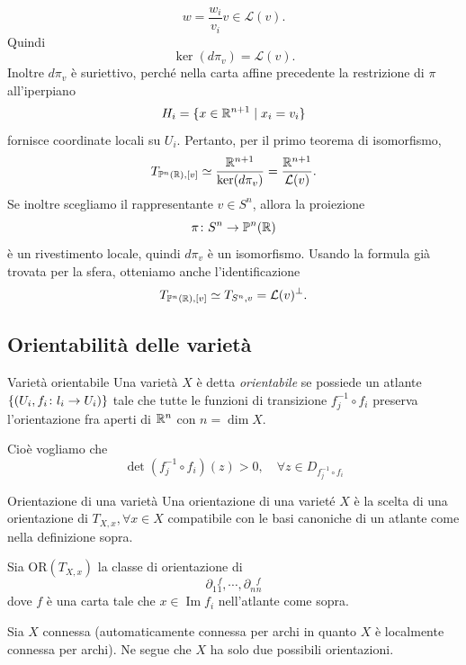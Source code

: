 \documentclass[a4paper]{article}
\begin{document}
\begin{snippetproof}{}
    \[
        w=\frac{w_i}{v_i}v\in\mathcal{L}(v).
    \]
    Quindi
    \[
        \ker(d\pi_v)=\mathcal{L}(v).
    \]
    Inoltre \(d\pi_v\) è suriettivo, perché nella carta affine precedente la restrizione di \(\pi\) all'iperpiano
    \[
        H_i=\{x\in\mathbb{R}^{n+1}\mid x_i=v_i\}
    \]
    fornisce coordinate locali su \(U_i\). Pertanto, per il primo teorema di isomorfismo,
    \[
        T_{\mathbb{P}^n(\mathbb{R}),[v]}
        \simeq
        \frac{\mathbb{R}^{n+1}}{\ker(d\pi_v)}
        =
        \frac{\mathbb{R}^{n+1}}{\mathcal{L}(v)}.
    \]
    Se inoltre scegliamo il rappresentante \(v\in S^n\), allora la proiezione
    \[
        \pi\colon S^n\to\mathbb{P}^n(\mathbb{R})
    \]
    è un rivestimento locale, quindi \(d\pi_v\) è un isomorfismo. Usando la formula già trovata per la sfera, otteniamo anche l'identificazione
    \[
        T_{\mathbb{P}^n(\mathbb{R}),[v]}
        \simeq
        T_{S^n,v}
        =
        \mathcal{L}(v)^\perp.
    \]
\end{snippetproof}

\subsection{Orientabilità delle varietà}

\begin{snippetdefinition}{Varietà orientabile}
    Una varietà \(X\) è detta \emph{orientabile}
    se possiede un atlante \(\{(U_i, f_i \colon l_i \to U_i)\}\)
    tale che tutte le funzioni di transizione \(f_j^{-1} \circ f_i\)
    preserva l'orientazione fra aperti di \(\mathbb{R}^n\)
    con \(n = \dim X\).
\end{snippetdefinition}

Cioè vogliamo che \[
    \det(f_j^{-1} \circ f_i)
    (z) > 0, \quad \forall z \in D_{f_j^{-1} \circ f_i}
\]

\begin{snippetdefinition}{Orientazione di una varietà}
    Una orientazione di una varieté \(X\) è la scelta di una orientazione
    di \(T_{X,x}, \forall x \in X\)
    compatibile con le basi canoniche di un atlante come nella definizione sopra.
\end{snippetdefinition}

Sia \(\text{OR}(T_{X,x})\) la classe di orientazione
di \[
    \partial_1{^f_1}, \cdots,
    \partial_n{^f_n}
\]
dove \(f\)
è una carta tale che \(x \in \operatorname{Im}f_i\) nell'atlante come sopra.

\begin{snippetproposition}{}
    Sia \(X\)
    connessa (automaticamente connessa per archi in quanto \(X\) è localmente connessa per archi).
    Ne segue che \(X\) ha solo due possibili orientazioni.
\end{snippetproposition}
\end{document}
